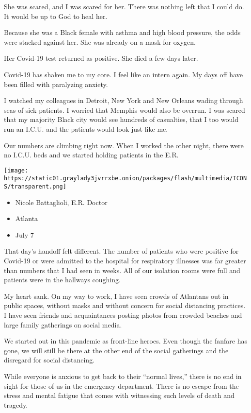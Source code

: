 She was scared, and I was scared for her. There was nothing left that I
could do. It would be up to God to heal her.

Because she was a Black female with asthma and high blood pressure, the
odds were stacked against her. She was already on a mask for oxygen.

Her Covid-19 test returned as positive. She died a few days later.

Covid-19 has shaken me to my core. I feel like an intern again. My days
off have been filled with paralyzing anxiety.

I watched my colleagues in Detroit, New York and New Orleans wading
through seas of sick patients. I worried that Memphis would also be
overrun. I was scared that my majority Black city would see hundreds of
casualties, that I too would run an I.C.U. and the patients would look
just like me.

Our numbers are climbing right now. When I worked the other night, there
were no I.C.U. beds and we started holding patients in the E.R.

\texttt{[image: https://static01.graylady3jvrrxbe.onion/packages/flash/multimedia/ICONS/transparent.png]}

\begin{itemize}
\tightlist
\item
  Nicole Battaglioli, E.R. Doctor
\item
  Atlanta
\item
  July 7
\end{itemize}

That day's handoff felt different. The number of patients who were
positive for Covid-19 or were admitted to the hospital for respiratory
illnesses was far greater than numbers that I had seen in weeks. All of
our isolation rooms were full and patients were in the hallways
coughing.

My heart sank. On my way to work, I have seen crowds of Atlantans out in
public spaces, without masks and without concern for social distancing
practices. I have seen friends and acquaintances posting photos from
crowded beaches and large family gatherings on social media.

We started out in this pandemic as front-line heroes. Even though the
fanfare has gone, we will still be there at the other end of the social
gatherings and the disregard for social distancing.

While everyone is anxious to get back to their ``normal lives,'' there
is no end in sight for those of us in the emergency department. There is
no escape from the stress and mental fatigue that comes with witnessing
such levels of death and tragedy.

